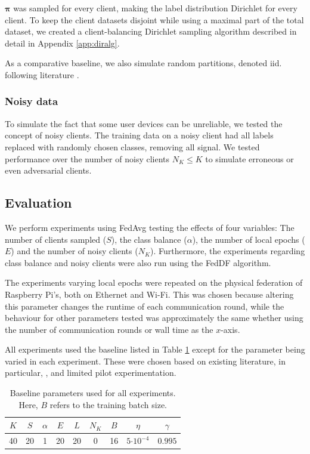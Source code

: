 \documentclass{article}
\newcommand{\ctp}[1]{\ensuremath{\cdot10^{#1}}}
\begin{document}
$\bm\pi$ was sampled for every client, making the label distribution Dirichlet for every client.
To keep the client datasets disjoint while using a maximal part of the total dataset, we created a client-balancing Dirichlet sampling algorithm described in detail in Appendix \ref{app:diralg}.

As a comparative baseline, we also simulate random partitions, denoted iid. following literature \cite{lin2020ensemble}.

\subsubsection{Noisy data}
To simulate the fact that some user devices can be unreliable, we tested the concept of noisy clients.
The training data on a noisy client had all labels replaced with randomly chosen classes, removing all signal.
We tested performance over the number of noisy clients $N_K\leq K$ to simulate erroneous or even adversarial clients.

\subsection{Evaluation}
We perform experiments using FedAvg testing the effects of four variables: The number of clients sampled ($S$), the class balance ($\alpha$), the number of local epochs ($E$) and the number of noisy clients ($N_K$). 
Furthermore, the experiments regarding class balance and noisy clients were also run using the FedDF algorithm.

The experiments varying local epochs were repeated on the physical federation of Raspberry Pi's, both on Ethernet and Wi-Fi.
This was chosen because altering this parameter changes the runtime of each communication round, while the behaviour for other parameters tested was approximately the same whether using the number of communication rounds or wall time as the $x$-axis.

All experiments used the baseline listed in Table \ref{tab:baseline} except for the parameter being varied in each experiment.
These were chosen based on existing literature, in particular, \cite{mcmahan2017communication,lin2020ensemble}, and limited pilot experimentation.

\begin{table}[htb!]
    \centering
    \begin{tabular}{ccccccccc}
        $K$ & $S$ & $\alpha$ & $E$ & $L$ & $N_K$ & $B$ & $\eta$ & $\gamma$\\
        \hline
        40 & 20 & 1 & 20 & 20 & 0 & 16 & $5\ctp{-4}$ & $0.995$
    \end{tabular}
    \caption{Baseline parameters used for all experiments.
        Here, $B$ refers to the training batch size.}
    \label{tab:baseline}
\end{table}
\end{document}
